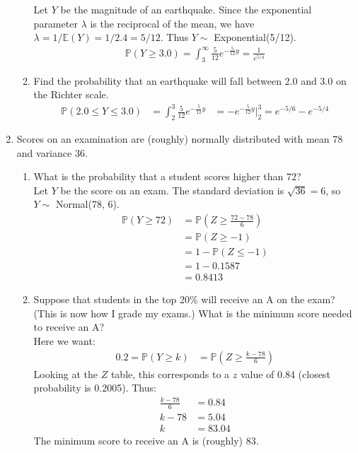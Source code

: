 \documentclass[12pt]{article}
\def\P{{\mathbb P}}
\def\E{{\mathbb E}}
\begin{document}
\begin{enumerate}
\begin{enumerate}
Let $Y$ be the magnitude of an earthquake. Since the exponential parameter $\lambda$ is the reciprocal of the mean, we have $\lambda = 1/\E(Y) = 1/2.4 = 5/12$. Thus $Y \sim$ Exponential(5/12).
\begin{align*}
\P(Y \geq 3.0) = \int_3^\infty \frac{5}{12} e^{-\frac{5}{12}y} = \frac{1}{e^{5/4}}
\end{align*}

\item Find the probability that an earthquake will fall between 2.0 and 3.0 on the Richter scale.\\

\begin{align*}
\P(2.0 \leq Y \leq 3.0) &= \int_2^3 \frac{5}{12} e^{-\frac{5}{12}y}
&= -e^{-\frac{5}{12}y}\Bigr|_2^3 = e^{-5/6} - e^{-5/4}
\end{align*}
\end{enumerate}

\item Scores on an examination are (roughly) normally distributed with mean 78 and variance 36.
\begin{enumerate}
\item What is the probability that a student scores higher than 72?\\

Let $Y$ be the score on an exam. The standard deviation is $\sqrt{36} = 6$, so $Y \sim$ Normal(78, 6).
\begin{align*}
\P(Y \geq 72) &= \P\left( Z \geq \frac{72 - 78}{6} \right) \\
&= \P(Z \geq -1) \\
&= 1 - \P(Z \leq -1) \\
&= 1 - 0.1587 \\
&= 0.8413
\end{align*}

\item Suppose that students in the top 20\% will receive an A on the exam? (This is now how I grade my exams.) What is the minimum score needed to receive an A?\\

Here we want:
\begin{align*}
0.2 = \P(Y \geq k) &= \P\left( Z \geq \frac{k - 78}{6} \right)
\end{align*}
Looking at the $Z$ table, this corresponds to a $z$ value of 0.84 (closest probability is 0.2005). Thus:
\begin{align*}
\frac{k - 78}{6} &= 0.84 \\
k - 78 &= 5.04 \\
k &= 83.04
\end{align*}
The minimum score to receive an A is (roughly) 83.
\end{enumerate}

\end{enumerate}
\end{document}
